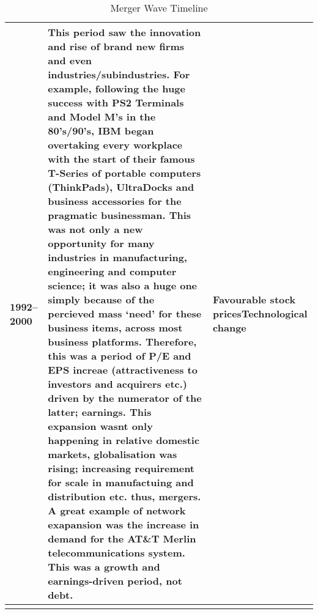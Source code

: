 \documentclass[11pt, english]{article}
\begin{document}
\begin{center}
\begin{longtable}{p{1.5cm}p{7cm}p{4cm}}
	1992--2000 & This period saw the innovation and rise of brand new firms and even industries/subindustries. For example, following the huge success with PS2 Terminals and Model M's in the 80's/90's, IBM began overtaking every workplace with the start of their famous T-Series of portable computers (ThinkPads), UltraDocks and business accessories for the pragmatic businessman. This was not only a new opportunity for many industries in manufacturing, engineering and computer science; it was also a huge one simply because of the percieved mass `need' for these business items, across most business platforms. Therefore, this was a period of P/E and EPS increae (attractiveness to investors and acquirers etc.) driven by the numerator of the latter; earnings. This expansion wasnt only happening in relative domestic markets, globalisation was rising; increasing requirement for scale in manufactuing and distribution etc. thus, mergers. A great example of network exapansion was the increase in demand for the AT\&T Merlin telecommunications system. This was a growth and earnings-driven period, not debt. & Favourable stock prices\newline Technological change\\
        \hline
        \caption{Merger Wave Timeline}
\end{longtable}
\end{center}

\newpage
\end{document}
